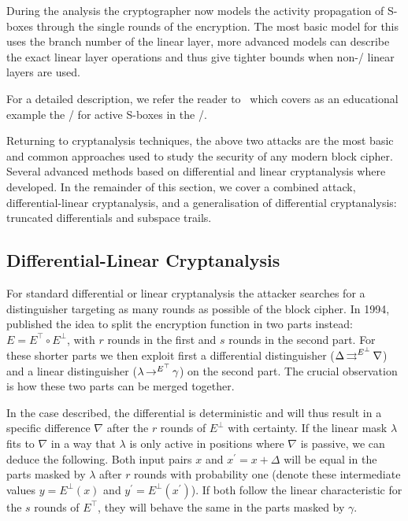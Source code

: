 During the analysis the cryptographer now models the activity propagation of S-boxes through the single rounds of the encryption.
The most basic model for this uses the branch number of the linear layer, more advanced models can describe the exact linear layer operations and thus give tighter bounds when non-\MDS/ linear layers are used.

For a detailed description, we refer the reader to~\cite{Inscrypt:MWGP11} which covers as an educational example the \MILP/ for active S-boxes in the \AES/.

Returning to cryptanalysis techniques, the above two attacks are the most basic and common approaches used to study the security of any modern block cipher.
Several advanced methods based on differential and linear cryptanalysis where developed.
In the remainder of this section, we cover a combined attack, differential-linear cryptanalysis, and a generalisation of differential cryptanalysis: truncated differentials and subspace trails.

\subsection{Differential-Linear Cryptanalysis}
For standard differential or linear cryptanalysis the attacker searches for a distinguisher targeting as many rounds as possible of the block cipher.
In 1994, \textcite{C:LanHel94} published the idea to split the encryption function in two parts instead: $E = E^{\top} \circ E^{\bot}$, with $r$ rounds in the first and $s$ rounds in the second part.
For these shorter parts we then exploit first a differential distinguisher ($\Delta \operatorname*{\rightrightarrows}^{E^\bot}_{} \nabla$) and a linear distinguisher ($\lambda \operatorname*{\rightarrow}^{E^\top}_{} \gamma$) on the second part.
The crucial observation is how these two parts can be merged together.

In the case \citeauthor{C:LanHel94} described, the differential is deterministic and will thus result in a specific difference $\nabla$ after the $r$ rounds of $E^\bot$ with certainty.
If the linear mask $\lambda$ fits to $\nabla$ in a way that $\lambda$ is only active in positions where $\nabla$ is passive, we can deduce the following.
Both input pairs $x$ and $x^\prime = x + \Delta$ will be equal in the parts masked by $\lambda$ after $r$ rounds with probability one (denote these intermediate values $y = E^\bot(x)$ and $y^\prime = E^\bot(x^\prime)$).
If both follow the linear characteristic for the $s$ rounds of $E^\top$, they will behave the same in the parts masked by $\gamma$.

